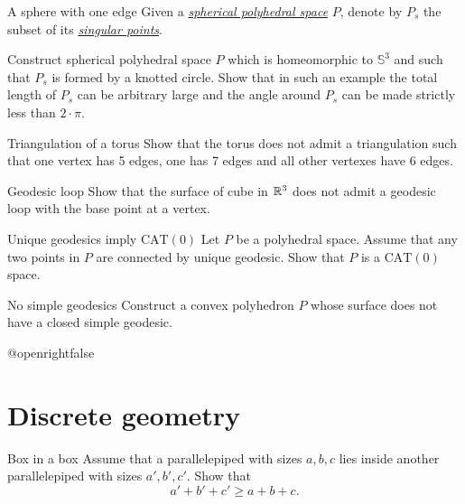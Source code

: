 \documentclass[twoside]{book}
\begin{document}
{\begin{pr}{\hard}{A sphere with one edge}\label{panov-S^3} 
Given  a \hyperref[Polyhedral space]{\emph{spherical polyhedral space}} $P$,
denote by $P_s$ the subset of its 
\hyperref[Polyhedral space]{\emph{singular points}}.

Construct spherical polyhedral space $P$ which is homeomorphic to $\mathbb{S}^3$ and such that $P_s$ is formed by a knotted circle.
Show that in such an example the total length of $P_s$ can be arbitrary large and the angle around $P_s$ can be made strictly less than $2\cdot\pi$.
\end{pr}

\begin{pr}{}{Triangulation of a torus}\label{Triangulation of a torus}
Show that the torus does not admit a triangulation 
such that one vertex has 5 edges,
one has 7 edges and 
all other vertexes have 
6 edges. 
\end{pr}

\begin{pr}{}{Geodesic loop}\label{Geodesic loop}
Show that the surface of cube in $\mathbb{R}^3$
does not admit a geodesic loop with the base point at a vertex.
\end{pr}

\begin{pr}{\easy}{Unique geodesics imply $\mathrm{CAT}(0)$}\label{Unique geodesics imply CAT}
Let $P$ be a polyhedral space.
Assume that any two points in $P$ 
are connected by unique geodesic.
Show that $P$ is a $\mathrm{CAT}(0)$ space.
\end{pr}

\begin{pr}{\easy}{No simple geodesics}\label{No simple geodesics}
Construct a convex polyhedron $P$ whose surface 
does not have a closed simple geodesic.
\end{pr}




\csname @openrightfalse\endcsname
\chapter{Discrete geometry}



\begin{pr}{}{Box in a box}\label{box-in-box} 
Assume that a parallelepiped with sizes $a,b,c$ 
lies inside another parallelepiped with sizes $a',b',c'$. 
Show that 
\[a'+b'+c'\ge a+b+c.\]

\end{pr}


}
\end{document}
